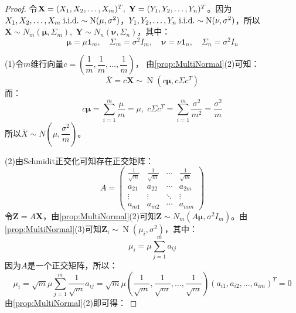 \begin{proof}
	令$\mathbf{X}=(X_1, X_2, \dots, X_{m})^T,\;\mathbf{Y}=(Y_1, Y_2, \dots, Y_{n})^T$。因为$X_1, X_2, \dots, X_{m}\;\text{i.i.d.}\sim \operatorname{N}(\mu,\sigma^2)$，$Y_1, Y_2, \dots, Y_{n}\;\text{i.i.d.}\sim \operatorname{N}(\nu,\sigma^2)$，所以$\mathbf{X}\sim N_m(\boldsymbol{\mu},\Sigma_m),\;\mathbf{Y}\sim N_n(\boldsymbol{\nu},\Sigma_n)$，其中：
	\begin{equation*}
		\boldsymbol{\mu}=\mu\mathbf{1}_m,\quad\Sigma_m=\sigma^2I_m,\quad\boldsymbol{\nu}=\nu\mathbf{1}_n,\quad\Sigma_n=\sigma^2I_n
	\end{equation*}\par
	(1)令$m$维行向量$c=\left(\dfrac{1}{m},\dfrac{1}{m},\dots,\dfrac{1}{m}\right)$，
	由\cref{prop:MultiNormal}(2)可知：
	\begin{equation*}
		\overline{X}=c\mathbf{X}\sim \operatorname{N}(c\boldsymbol{\mu},c\Sigma c^T)
	\end{equation*}
	而：
	\begin{equation*}
		c\boldsymbol{\mu}=\sum_{i=1}^{m}\frac{\mu}{m}=\mu,\;c\Sigma c^T=\sum_{i=1}^{m}\frac{\sigma^2}{m^2}=\frac{\sigma^2}{m}
	\end{equation*}
	所以$\overline{X}\sim N\left(\mu,\dfrac{\sigma^2}{m}\right)$。\par
	(2)由Schmidit正交化可知存在正交矩阵：
	\begin{equation*}
		A=
		\begin{pmatrix}
			\frac{1}{\sqrt{m}} & \frac{1}{\sqrt{m}} & \cdots & \frac{1}{\sqrt{m}} \\
			a_{21} & a_{22} & \cdots & a_{2m} \\
			\vdots & \vdots & \ddots & \vdots \\
			a_{m1} & a_{m2} & \cdots & a_{mm}
		\end{pmatrix}
	\end{equation*}
	令$\mathbf{Z}=A\mathbf{X}$，由\cref{prop:MultiNormal}(2)可知$\mathbf{Z}\sim N_m(A\boldsymbol{\mu},\sigma^2I_m)$。由\cref{prop:MultiNormal}(3)可知$\mathbf{Z}_i\sim \operatorname{N}(\mu_i,\sigma^2)$，其中：
	\begin{equation*}
		\mu_i=\mu\sum_{j=1}^{m}a_{ij}
	\end{equation*}
	因为$A$是一个正交矩阵，所以：
	\begin{equation*}
		\mu_i=\sqrt{m}\mu\sum_{j=1}^{m}\frac{1}{\sqrt{m}}a_{ij}=\sqrt{m}\mu\left(\dfrac{1}{\sqrt{m}},\dfrac{1}{\sqrt{m}},\dots,\dfrac{1}{\sqrt{m}}\right)(a_{i1},a_{i2},\dots,a_{im})^T=0
	\end{equation*}
	由\cref{prop:MultiNormal}(2)即可得：

\end{proof}
